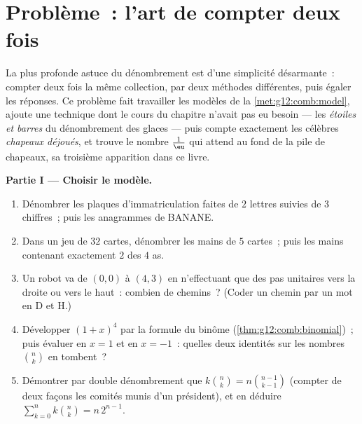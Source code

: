 \section{Problème~: l'art de compter deux fois}

\begin{problem}
\label{pb:g12:comb:1}
La plus profonde astuce du dénombrement est d'une simplicité
désarmante~: compter deux fois la même collection, par deux méthodes
différentes, puis égaler les réponses. Ce problème fait travailler
les modèles de la \cref{met:g12:comb:model}, ajoute une technique
dont le cours du chapitre n'avait pas eu besoin --- les
\emph{étoiles et barres} du dénombrement des glaces --- puis compte
exactement les célèbres \emph{chapeaux déjoués}, et trouve le nombre
$\frac1\eu$ qui attend au fond de la pile de chapeaux, sa troisième
apparition dans ce livre.

\medskip
\noindent\textbf{Partie I --- Choisir le modèle.}
\begin{enumerate}
  \item Dénombrer les plaques d'immatriculation faites de $2$
        lettres suivies de $3$ chiffres~; puis les anagrammes de
        BANANE.
  \item Dans un jeu de $32$ cartes, dénombrer les mains de $5$
        cartes~; puis les mains contenant exactement $2$ des $4$
        as.
  \item Un robot va de $(0,0)$ à $(4,3)$ en n'effectuant que des
        pas unitaires vers la droite ou vers le haut~: combien de
        chemins~? (Coder un chemin par un mot en D et H.)
  \item Développer $(1 + x)^4$ par la formule du binôme
        (\cref{thm:g12:comb:binomial})~; puis évaluer en $x = 1$ et
        en $x = -1$~: quelles deux identités sur les nombres
        $\binom nk$ en tombent~?
  \item Démontrer par double dénombrement que
        $k\binom nk = n\binom{n-1}{k-1}$ (compter de deux façons les
        comités munis d'un président), et en déduire
        $\sum_{k=0}^{n} k\binom nk = n\,2^{n-1}$.
\end{enumerate}


\end{problem}
